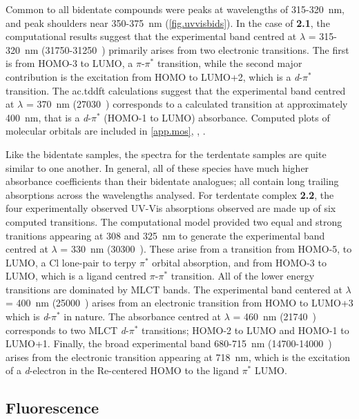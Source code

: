 Common to all bidentate compounds were peaks at wavelengths of 315-320~nm, and peak shoulders near 350-375~nm (\autoref{fig.uvvisbids}). In the case of \textbf{2.1}, the computational results suggest that the experimental band centred at $\lambda$ = 315-320~nm (31750-31250~) primarily arises from two electronic transitions. The first is from HOMO-3 to LUMO, a $\pi$-$\pi^\ast$ transition, while the second major contribution is the excitation from HOMO to LUMO+2, which is a \textit{d}-$\pi^\ast$ transition. The \gls{ac.tddft} calculations suggest that the experimental band centred at $\lambda$ = 370~nm (27030~) corresponds to a calculated transition at approximately 400~nm, that is a \textit{d}-$\pi^\ast$ (HOMO-1 to LUMO) absorbance. Computed plots of molecular orbitals are included in \autoref{app.mos}, , .

Like the bidentate samples, the spectra for the terdentate samples are quite similar to one another. In general, all of these species have much higher absorbance coefficients than their bidentate analogues; all contain long trailing absorptions across the wavelengths analysed. For terdentate complex \textbf{2.2}, the four experimentally observed UV-Vis absorptions observed are made up of six computed transitions. The computational model provided two equal and strong tranitions appearing at 308 and 325~nm to generate the experimental band centred at $\lambda$ = 330~nm (30300~). These arise from a transition from HOMO-5, to LUMO, a Cl lone-pair to terpy $\pi^\ast$ orbital absorption, and from HOMO-3 to LUMO, which is a ligand centred $\pi$-$\pi^\ast$ transition. All of the lower energy transitions are dominated by MLCT bands. The experimental band centered at $\lambda$ = 400~nm (25000~) arises from an electronic transition from HOMO to LUMO+3 which is \textit{d}-$\pi^\ast$ in nature. The absorbance centred at $\lambda$ = 460~nm (21740~) corresponds to two MLCT \textit{d}-$\pi^\ast$ transitions; HOMO-2 to LUMO and HOMO-1 to LUMO+1. Finally, the broad experimental band 680-715~nm (14700-14000~) arises from the electronic transition appearing at 718~nm, which is the excitation of a \textit{d}-electron in the Re-centered HOMO to the ligand $\pi^\ast$ LUMO.

\FloatBarrier
\subsection{Fluorescence}\label{ss.fluorescence}

